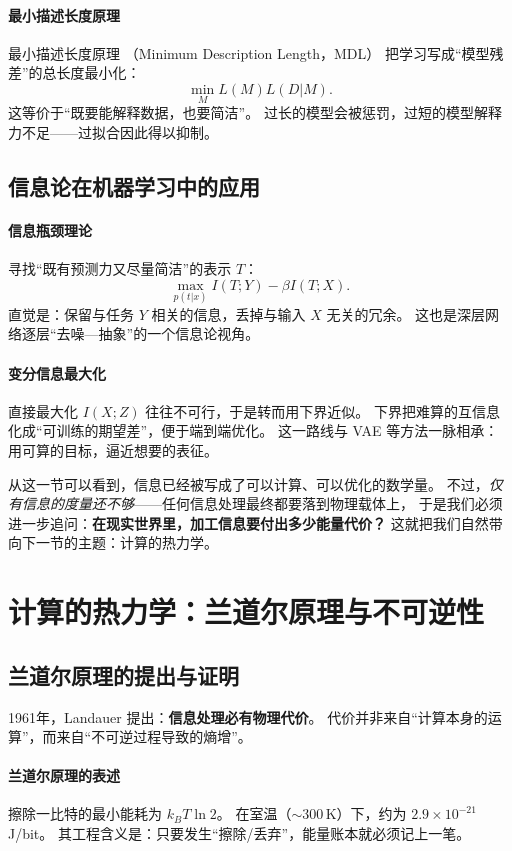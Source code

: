 \paragraph{最小描述长度原理}
最小描述长度原理 （Minimum Description Length，MDL） 把学习写成“模型残差”的总长度最小化：
$$\min_ML(M)L(D|M).$$
这等价于“既要能解释数据，也要简洁”。  
过长的模型会被惩罚，过短的模型解释力不足——过拟合因此得以抑制。

\subsection{信息论在机器学习中的应用}

\paragraph{信息瓶颈理论}
寻找“既有预测力又尽量简洁”的表示 $T$：
$$\max_{p(t|x)} I(T;Y)-\beta I(T;X).$$
直觉是：保留与任务 $Y$ 相关的信息，丢掉与输入 $X$ 无关的冗余。  
这也是深层网络逐层“去噪—抽象”的一个信息论视角。

\paragraph{变分信息最大化}
直接最大化 $I(X;Z)$ 往往不可行，于是转而用下界近似。  
下界把难算的互信息化成“可训练的期望差”，便于端到端优化。  
这一路线与 VAE 等方法一脉相承：用可算的目标，逼近想要的表征。

从这一节可以看到，信息已经被写成了可以计算、可以优化的数学量。  
不过，\emph{仅有信息的度量还不够}——任何信息处理最终都要落到物理载体上，  
于是我们必须进一步追问：\textbf{在现实世界里，加工信息要付出多少能量代价？}  
这就把我们自然带向下一节的主题：计算的热力学。

\section{计算的热力学：兰道尔原理与不可逆性}

\subsection{兰道尔原理的提出与证明}

1961年，Landauer 提出：\textbf{信息处理必有物理代价}。  
代价并非来自“计算本身的运算”，而来自“不可逆过程导致的熵增”。

\paragraph{兰道尔原理的表述}
擦除一比特的最小能耗为 $k_BT\ln2$。  
在室温（$\sim300\,$K）下，约为 $2.9\times10^{-21}$\,J/bit。  
其工程含义是：只要发生“擦除/丢弃”，能量账本就必须记上一笔。

